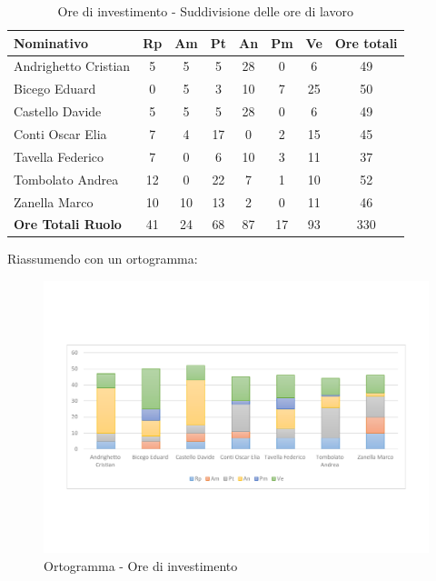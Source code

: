 \documentclass[../PianoProgetto.tex]{subfiles}
\begin{document}
	\begin{table}[h]
		\begin{tabularx}{\textwidth}{l  * {6}{C}  c}
			\toprule
			\textbf{Nominativo} & \textbf{Rp} & \textbf{Am} & \textbf{Pt} 
						& \textbf{An} & \textbf{Pm} & \textbf{Ve} & \textbf{Ore totali} \\
			\midrule
			Andrighetto Cristian & 5 & 5 & 5 & 28 &	0 &	6 &	49 \\
			Bicego Eduard & 0 & 5 & 3 & 10 & 7 & 25 & 50 \\
			Castello Davide & 5 & 5 & 5 & 28 & 0 & 6 & 49 \\
			Conti Oscar Elia & 7 & 4 & 17 & 0 & 2 & 15 & 45 \\
			Tavella Federico &	7 & 0 & 6 & 10 & 3 & 11 & 37 \\
			Tombolato Andrea & 12 & 0 & 22 & 7 & 1 & 10 & 52 \\
			Zanella Marco & 10 & 10 & 13 & 2 & 0 & 11 & 46 \\
			\midrule			
			\textbf{Ore Totali Ruolo} & 41 & 24 & 68 & 87 & 17 & 93 & 330 \\
			\bottomrule
		\end{tabularx}
		\caption{Ore di investimento - Suddivisione delle ore di lavoro}
		\label{tab:investimento_ore}
	\end{table}
\vfill	
	Riassumendo con un ortogramma:
	
	\begin{figure}[!h]
		\centering
		\includegraphics[width=\textwidth , trim=2cm 5cm 2cm 5cm]{grafici/Riepilogo/Investimento/ore-persona}
			\caption{Ortogramma - Ore di investimento}
		\label{fig:BarChart-investimento_ore}
	\end{figure}
\vfill
\newpage
\vfill	
\end{document}
